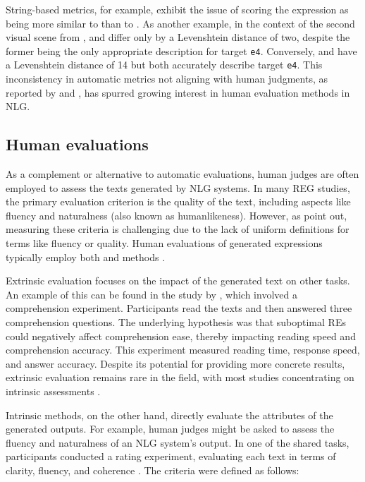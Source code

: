 String-based metrics, for example, exhibit the issue of scoring the expression  as being more similar to  than to . As another example, in the context of the second visual scene from ,  and  differ only by a Levenshtein distance of two, despite the former being the only appropriate description for target \texttt{e4}. Conversely,  and  have a Levenshtein distance of 14 but both accurately describe target \texttt{e4}. This inconsistency in automatic metrics not aligning with human judgments, as reported by \citet{reiter2009investigation} and \citet{belz2010generating}, has spurred growing interest in human evaluation methods in NLG.



\subsection{Human evaluations}\label{humaneval}

As a complement or alternative to automatic evaluations, human judges are often employed to assess the texts generated by NLG systems. In many REG studies, the primary evaluation criterion is the quality of the text, including aspects like fluency and naturalness (also known as humanlikeness). However, as \citet{van2019best} point out, measuring these criteria is challenging due to the lack of uniform definitions for terms like fluency or quality. Human evaluations of generated expressions typically employ both  and  methods \citep{belz-reiter-2006-comparing, reiter2009investigation}.

Extrinsic evaluation focuses on the impact of the generated text on other tasks. An example of this can be found in the study by \citet{belz2010generating}, which involved a comprehension experiment. Participants read the texts and then answered three comprehension questions. The underlying hypothesis was that suboptimal REs could negatively affect comprehension ease, thereby impacting reading speed and comprehension accuracy. This experiment measured reading time, response speed, and answer accuracy. Despite its potential for providing more concrete results, extrinsic evaluation remains rare in the field, with most studies concentrating on intrinsic assessments \citep{van2019best}.


Intrinsic methods, on the other hand, directly evaluate the attributes of the generated outputs. For example, human judges might be asked to assess the fluency and naturalness of an NLG system’s output. In one of the  shared tasks, participants conducted a rating experiment, evaluating each text in terms of clarity, fluency, and coherence \citep[312]{belz2010generating}. The criteria were defined as follows:

